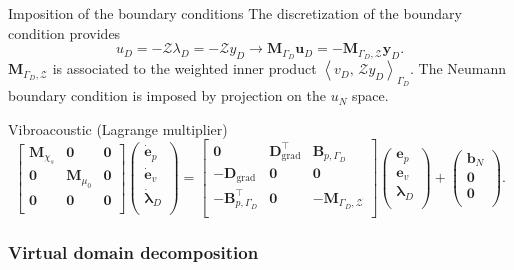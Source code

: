 \documentclass[aspectratio=169]{ISAE-Beamer}
\DeclareMathOperator*{\grad}{grad}
\newcommand{\inner}[3][]{\ensuremath{\left\langle #2, \, #3 \right\rangle_{#1}}}
\begin{document}
\begin{frame}{Imposition of the boundary conditions}
The discretization of the boundary condition provides
\[ u_D=-\mathcal{Z}\lambda_D=-\mathcal{Z}y_D \longrightarrow \mathbf{M}_{\Gamma_D} \mathbf{u}_D = - \mathbf{M}_{\Gamma_D, \mathcal{Z}} {\mathbf{y}}_D.
\]
$\mathbf{M}_{\Gamma_D, \mathcal{Z}}$ is associated to the weighted inner product $\inner[\Gamma_D]{v_D}{\mathcal{Z} y_D}$. The Neumann boundary condition is imposed by projection on the $u_N$ space.   

\begin{block}{Vibroacoustic (Lagrange multiplier)}
\begin{equation*}
\begin{bmatrix}
\mathbf{M}_{\chi_s} & \mathbf{0} & \mathbf{0}\\
\mathbf{0} & \mathbf{M}_{\mu_0} & \mathbf{0} \\
\mathbf{0} & \mathbf{0} & \mathbf{0} \\
\end{bmatrix}
\begin{pmatrix}
\dot{\mathbf{e}}_p\\
\dot{\mathbf{e}}_v\\
\dot{\bm{\lambda}}_D \\
\end{pmatrix}
= \begin{bmatrix}
\mathbf{0} & \mathbf{D}_{\grad}^\top & \mathbf{B}_{p, \Gamma_D}\\
-\mathbf{D}_{\grad} & \mathbf{0} & \mathbf{0} \\
-\mathbf{B}_{p, \Gamma_D}^\top & \mathbf{0} & -\mathbf{M}_{\Gamma_D, \mathcal{Z}} \\
\end{bmatrix}
\begin{pmatrix}
{\mathbf{e}}_p\\
{\mathbf{e}}_v\\
{\bm{\lambda}}_D \\
\end{pmatrix} + \begin{pmatrix}
\mathbf{b}_N \\
\mathbf{0}\\
\mathbf{0}\\
\end{pmatrix}.
\end{equation*}
\end{block}

\end{frame}

\subsubsection{Virtual domain decomposition}
\end{document}
